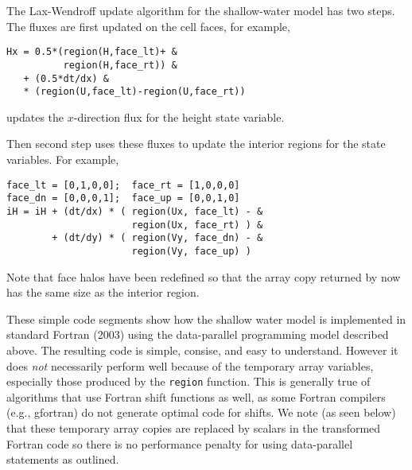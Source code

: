The Lax-Wendroff update algorithm for the shallow-water model has
two steps.  The fluxes are first updated on the cell faces, for
example,

{\small
\begin{verbatim}
Hx = 0.5*(region(H,face_lt)+ &
          region(H,face_rt)) &
   + (0.5*dt/dx) &
   * (region(U,face_lt)-region(U,face_rt))
\end{verbatim}
}

updates the $x$-direction flux for the height state variable.

Then second step uses these fluxes to update the interior regions for
the state variables.  For example,

{\small
\begin{verbatim}
face_lt = [0,1,0,0];  face_rt = [1,0,0,0]
face_dn = [0,0,0,1];  face_up = [0,0,1,0]
iH = iH + (dt/dx) * ( region(Ux, face_lt) - &
                      region(Ux, face_rt) ) &
        + (dt/dy) * ( region(Vy, face_dn) - &
                      region(Vy, face_up) )
\end{verbatim}
}

Note that face halos have been redefined so that the array copy
returned by now has the same size as the interior region.

These simple code segments show how the shallow water model is
implemented in standard Fortran (2003) using the data-parallel
programming model described above.  The resulting code is simple,
consise, and easy to understand.  However it does \emph{not}
necessarily perform well because of the temporary array variables,
especially those produced by the {\tt region} function.  This is
generally true of algorithms that use Fortran shift functions as well,
as some Fortran compilers (e.g., gfortran) do not generate optimal
code for shifts.  We note (as seen below) that these temporary array
copies are replaced by scalars in the transformed Fortran code so
there is no performance penalty for using data-parallel statements as
outlined.
